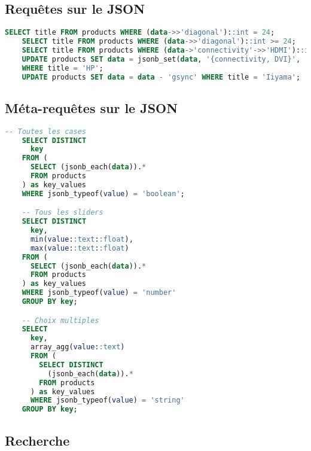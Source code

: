 \documentclass[a4paper,10pt]{article}
\begin{document}
  \subsection{Requêtes sur le JSON}
    \begin{lstlisting}[language=SQL, gobble=4, tabsize=2, showstringspaces=false]
    SELECT title FROM products WHERE (data->>'diagonal')::int = 24;
    SELECT title FROM products WHERE (data->>'diagonal')::int >= 24;
    SELECT title FROM products WHERE (data->'connectivity'->>'HDMI')::int >= 1;
    UPDATE products SET data = jsonb_set(data, '{connectivity, DVI}', '2')
    WHERE title = 'HP';
    UPDATE products SET data = data - 'gsync' WHERE title = 'Iiyama';
    \end{lstlisting}

  \subsection{Méta-requêtes sur le JSON}
    \begin{lstlisting}[language=SQL, gobble=4, tabsize=2, showstringspaces=false]
    -- Toutes les cases
    SELECT DISTINCT
      key
    FROM (
      SELECT (jsonb_each(data)).*
      FROM products
    ) as key_values
    WHERE jsonb_typeof(value) = 'boolean';

    -- Tous les sliders
    SELECT DISTINCT
      key,
      min(value::text::float),
      max(value::text::float)
    FROM (
      SELECT (jsonb_each(data)).*
      FROM products
    ) as key_values
    WHERE jsonb_typeof(value) = 'number'
    GROUP BY key;

    -- Choix multiples
    SELECT
      key,
      array_agg(value::text)
      FROM (
        SELECT DISTINCT
          (jsonb_each(data)).*
        FROM products
      ) as key_values
      WHERE jsonb_typeof(value) = 'string'
    GROUP BY key;
    \end{lstlisting}

  \subsection{Recherche}

\end{document}
